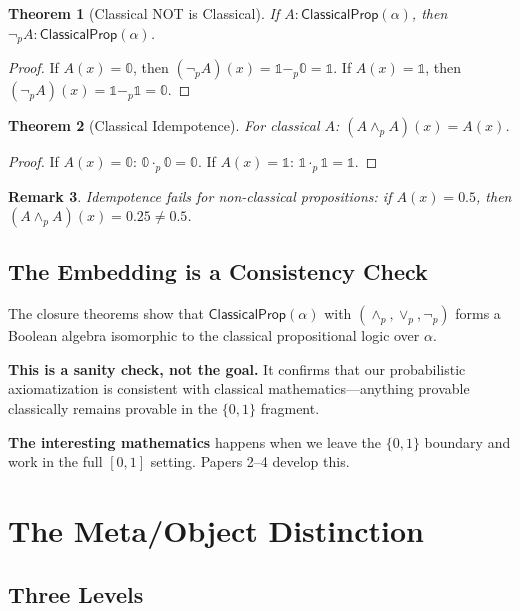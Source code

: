 \documentclass[11pt,a4paper]{article}
\newtheorem{theorem}{Theorem}[section]
\newtheorem{remark}[theorem]{Remark}
\newcommand{\pand}{\wedge_p}
\newcommand{\por}{\vee_p}
\newcommand{\pnot}{\neg_p}
\newcommand{\pzero}{\mathbb{0}}
\newcommand{\pone}{\mathbb{1}}
\newcommand{\pmul}{\cdot_p}
\newcommand{\psub}{-_p}
\begin{document}
\begin{theorem}[Classical NOT is Classical]
If $A : \mathsf{ClassicalProp}(\alpha)$, then $\pnot A : \mathsf{ClassicalProp}(\alpha)$.
\end{theorem}

\begin{proof}
If $A(x) = \pzero$, then $(\pnot A)(x) = \pone \psub \pzero = \pone$.
If $A(x) = \pone$, then $(\pnot A)(x) = \pone \psub \pone = \pzero$.
\end{proof}

\begin{theorem}[Classical Idempotence]
For classical $A$: $(A \pand A)(x) = A(x)$.
\end{theorem}

\begin{proof}
If $A(x) = \pzero$: $\pzero \pmul \pzero = \pzero$.
If $A(x) = \pone$: $\pone \pmul \pone = \pone$.
\end{proof}

\begin{remark}
Idempotence fails for non-classical propositions: if $A(x) = 0.5$, then $(A \pand A)(x) = 0.25 \neq 0.5$.
\end{remark}

\subsection{The Embedding is a Consistency Check}

The closure theorems show that $\mathsf{ClassicalProp}(\alpha)$ with $(\pand, \por, \pnot)$ forms a Boolean algebra isomorphic to the classical propositional logic over $\alpha$.

\textbf{This is a sanity check, not the goal.} It confirms that our probabilistic axiomatization is consistent with classical mathematics---anything provable classically remains provable in the $\{0,1\}$ fragment.

\textbf{The interesting mathematics} happens when we leave the $\{0,1\}$ boundary and work in the full $[0,1]$ setting. Papers 2--4 develop this.

\section{The Meta/Object Distinction}

\subsection{Three Levels}
\end{document}
